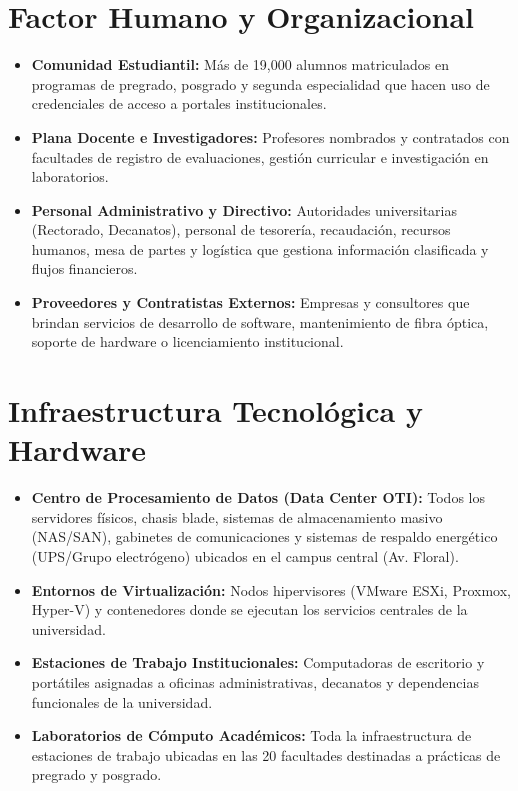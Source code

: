 \section{Factor Humano y Organizacional}

\begin{itemize}[itemsep=3pt,topsep=2pt,parsep=0pt]
    \item \textbf{Comunidad Estudiantil:} Más de 19,000 alumnos matriculados en programas de pregrado, posgrado y segunda especialidad que hacen uso de credenciales de acceso a portales institucionales.

    \item \textbf{Plana Docente e Investigadores:} Profesores nombrados y contratados con facultades de registro de evaluaciones, gestión curricular e investigación en laboratorios.

    \item \textbf{Personal Administrativo y Directivo:} Autoridades universitarias (Rectorado, Decanatos), personal de tesorería, recaudación, recursos humanos, mesa de partes y logística que gestiona información clasificada y flujos financieros.

    \item \textbf{Proveedores y Contratistas Externos:} Empresas y consultores que brindan servicios de desarrollo de software, mantenimiento de fibra óptica, soporte de hardware o licenciamiento institucional.
\end{itemize}

\clearpage

\section{Infraestructura Tecnológica y Hardware}

\begin{itemize}[itemsep=3pt,topsep=2pt,parsep=0pt]
    \item \textbf{Centro de Procesamiento de Datos (Data Center OTI):} Todos los servidores físicos, chasis blade, sistemas de almacenamiento masivo (NAS/SAN), gabinetes de comunicaciones y sistemas de respaldo energético (UPS/Grupo electrógeno) ubicados en el campus central (Av. Floral).

    \item \textbf{Entornos de Virtualización:} Nodos hipervisores (VMware ESXi, Proxmox, Hyper-V) y contenedores donde se ejecutan los servicios centrales de la universidad.

    \item \textbf{Estaciones de Trabajo Institucionales:} Computadoras de escritorio y portátiles asignadas a oficinas administrativas, decanatos y dependencias funcionales de la universidad.

    \item \textbf{Laboratorios de Cómputo Académicos:} Toda la infraestructura de estaciones de trabajo ubicadas en las 20 facultades destinadas a prácticas de pregrado y posgrado.
\end{itemize}

